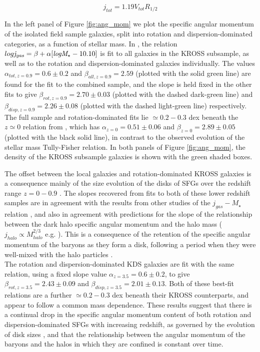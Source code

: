 \documentclass[fleqn,usenatbib]{mnras}
\begin{document}
\begin{equation}\label{eq:ang_mom_final}
  j_{tot} = 1.19V_{tot}R_{1/2}
\end{equation}

\noindent
In the left panel of Figure \ref{fig:ang_mom} we plot the specific angular momentum of the isolated field sample galaxies, split into rotation and dispersion-dominated categories, as a function of stellar mass.
In \cite{Harrison2017}, the relation $log{\it j_{gas}} =  \beta + \alpha[{\it logM_{\star}} - 10.10]$ is fit to all galaxies in the KROSS subsample, as well as to the rotation and dispersion-dominated galaxies individually.
The values $\alpha_{tot,z=0.9}=0.6\pm0.2$ and $\beta_{all,z=0.9}=2.59$ (plotted with the solid green line) are found for the fit to the combined sample, and the slope is held fixed in the other fits to give $\beta_{rot,z=0.9}=2.70\pm0.03$ (plotted with the dashed dark-green line) and $\beta_{disp,z=0.9}=2.26\pm0.08$ (plotted with the dashed light-green line) respectively.  
The full sample and rotation-dominated fits lie $\simeq0.2-0.3$ dex beneath the $z\simeq0$ relation from \cite{Romanowsky2012}, which has $\alpha_{z=0}=0.51\pm0.06$ and $\beta_{z=0}=2.89\pm0.05$ (plotted with the black solid line), in contrast to the observed evolution of the stellar mass Tully-Fisher relation.
In both panels of Figure \ref{fig:ang_mom}, the density of the KROSS subsample galaxies is shown with the green shaded boxes.

\noindent
The offset between the local galaxies and rotation-dominated KROSS galaxies is a consequence mainly of the size evolution of the disks of SFGs over the redshift range $z=0-0.9$ \citep[e.g.][]{Trujillo2007,VanderWel2014a}.
The slopes recovered from fits to both of these lower redshift samples are in agreement with the results from other studies of the $j_{gas}-M_{\star}$ relation \citep[e.g.][]{Cortese2016,Contini2015a,Burkert2016a,Lagos2017,Swinbank2017}, and also in agreement with predictions for the slope of the relationship between the dark halo specific angular momentum and the halo mass ($j_{halo} \propto M_{halo}^{2/3}$ e.g. \citealt{Barnes1987}).
This is a consequence of the retention of the specific angular momentum of the baryons as they form a disk, following a period when they were well-mixed with the halo particles \citep[e.g.][]{Mo1998}. \\

\noindent
The rotation and dispersion-dominated KDS galaxies are fit with the same relation, using a fixed slope value $\alpha_{z=3.5} = 0.6\pm0.2$, to give $\beta_{rot,z=3.5}=2.43\pm0.09$ and $\beta_{disp,z=3.5}=2.01\pm0.13$.
Both of these best-fit relations are a further $\simeq0.2-0.3$ dex beneath their KROSS counterparts, and appear to follow a common mass dependence.
These results suggest that there is a continual drop in the specific angular momentum content of both rotation and dispersion-dominated SFGs with increasing redshift, as governed by the evolution of disk sizes \citep[e.g.][]{Trujillo2007}, and that the relationship between the angular momentum of the baryons and the halos in which they are confined is constant over time. \\
\end{document}
